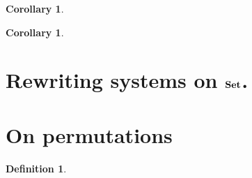 \documentclass[a4paper]{article}
\def\Set{\textbf {\textup{Set}}}
\newtheorem{corollary}[theorem]{Corollary}
\theoremstyle{definition}
\newtheorem{definition}[theorem]{Definition}
\begin{document}
\begin{corollary}
\end{corollary}

\begin{corollary}
\end{corollary}





\section{Rewriting systems on $\Set$.}\label{app:set}

\section{On permutations}\label{app:perm}


\begin{definition}
\end{definition}
\end{document}
